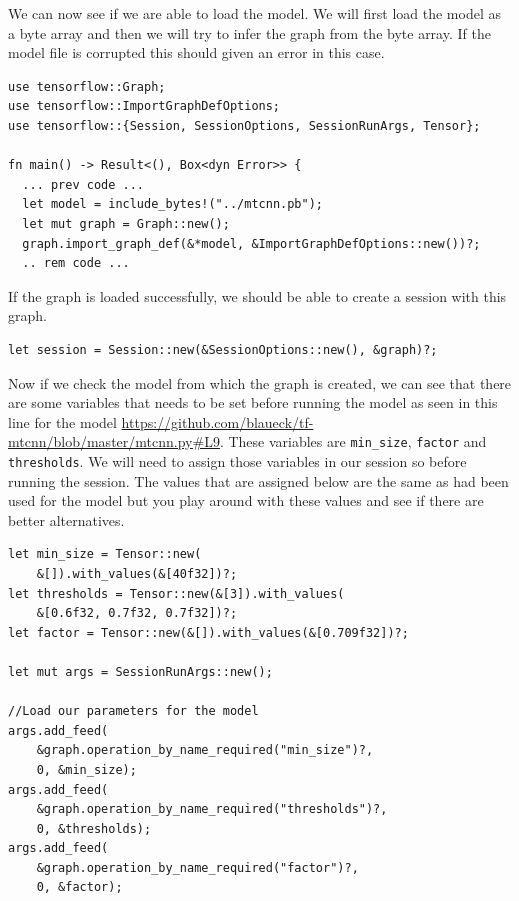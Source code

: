 \documentclass{book}
\begin{document}
We can now see if we are able to load the model. We will first load the model as a byte array and then we will try to infer the graph from the byte array. If the model file is corrupted this should given an error in this case.

\begin{lstlisting}[caption={chapter6/face-detection-tf/src/main.rs}, basicstyle=\small]
use tensorflow::Graph;
use tensorflow::ImportGraphDefOptions;
use tensorflow::{Session, SessionOptions, SessionRunArgs, Tensor};

fn main() -> Result<(), Box<dyn Error>> {
  ... prev code ...
  let model = include_bytes!("../mtcnn.pb");
  let mut graph = Graph::new();
  graph.import_graph_def(&*model, &ImportGraphDefOptions::new())?;
  .. rem code ...
\end{lstlisting}

If the graph is loaded successfully, we should be able to create a session with this graph.

\begin{lstlisting}[caption={chapter6/face-detection-tf/src/main.rs}, basicstyle=\small]
let session = Session::new(&SessionOptions::new(), &graph)?;
\end{lstlisting}

Now if we check the model from which the graph is created, we can see that there are some variables that needs to be set before running the model as seen in this line for the model \href{https://github.com/blaueck/tf-mtcnn/blob/master/mtcnn.py#L9}{https://github.com/blaueck/tf-mtcnn/blob/master/mtcnn.py\#L9}. These variables are \lstinline{min_size}, \lstinline{factor} and \lstinline{thresholds}. We will need to assign those variables in our session so before running the session. The values that are assigned below are the same as had been used for the model but you play around with these values and see if there are better alternatives.

\begin{lstlisting}[caption={chapter6/face-detection-tf/src/main.rs}, basicstyle=\small]
let min_size = Tensor::new(
	&[]).with_values(&[40f32])?;
let thresholds = Tensor::new(&[3]).with_values(
	&[0.6f32, 0.7f32, 0.7f32])?;
let factor = Tensor::new(&[]).with_values(&[0.709f32])?;

let mut args = SessionRunArgs::new();

//Load our parameters for the model
args.add_feed(
	&graph.operation_by_name_required("min_size")?,
	0, &min_size);
args.add_feed(
	&graph.operation_by_name_required("thresholds")?,
	0, &thresholds);
args.add_feed(
	&graph.operation_by_name_required("factor")?,
	0, &factor);
\end{lstlisting}
\end{document}
